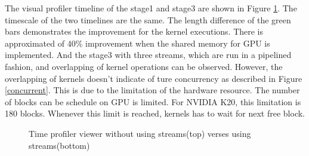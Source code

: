 \documentclass[journal,11pt,onecolumn,draftclsnofoot]{ieeeconf}  %
\begin{document}
The visual profiler timeline of the stage1 and stage3 are shown in Figure \ref{viewer}. The timescale of the two timelines are the same. The length difference of the green bars demonstrates the improvement for the kernel executions. There is approximated of 40\% improvement when the shared memory for GPU is implemented. And the stage3 with three streams, which are run in a pipelined fashion, and overlapping of kernel operations can be observed. However, the overlapping of kernels doesn't indicate of ture concurrency as described in Figure \ref{concurrent}. This is due to the limitation of the hardware resource. The number of blocks can be schedule on GPU is limited. For NVIDIA K20, this limitation is 180 blocks. Whenever this limit is reached, kernels has to wait for next free block.

\begin{figure}[!tbp]
	\centering
	\vspace*{-5mm}
	\begin{minipage}[b]{1\textwidth}
	\end{minipage}
	\begin{minipage}[b]{1\textwidth}
	\end{minipage}
	
	\caption{Time profiler viewer without using streams(top) verses using streams(bottom)}
	\label{viewer}
	\vspace*{-5mm}
\end{figure}
\end{document}
